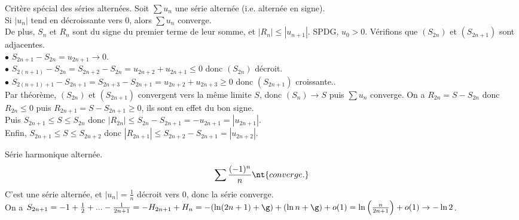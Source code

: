 \documentclass[11pt]{article}
\begin{document}
\begin{prop}{Critère spécial des séries alternées.}{}
    Soit $\sum u_n$ une série alternée (i.e. alternée en signe).\\
    Si $|u_n|$ tend en décroissante vers 0, alors $\sum u_n$ converge.\\
    De plus, $S_n$ et $R_n$ sont du signe du premier terme de leur somme, et $|R_n|\leq|u_{n+1}|$.
    \tcblower
    SPDG, $u_0>0$. Vérifions que $(S_{2n})$ et $(S_{2n+1})$ sont adjacentes.\\
    $\bullet$ $S_{2n+1}-S_{2n}=u_{2n+1}\to0$.\\
    $\bullet$ $S_{2(n+1)}-S_{2n}=S_{2n+2}-S_{2n}=u_{2n+2}+u_{2n+1}\leq 0$ donc $(S_{2n})$ décroit.\\
    $\bullet$ $S_{2(n+1)+1}-S_{2n+1}=S_{2n+3}-S_{2n+1}=u_{2n+2}+u_{2n+3}\geq0$ donc $(S_{2n+1})$ croissante..\\
    Par théorème, $(S_{2n})$ et $(S_{2n+1})$ convergent vers la même limite $S$, donc $(S_n)\to S$ puis $\sum u_n$ converge.\n
    On a $R_{2n}=S-S_{2n}$ donc $R_{2n}\leq0$ puis $R_{2n+1}=S-S_{2n+1}\geq0$, ils sont en effet du bon signe.\\
    Puis $S_{2n+1}\leq S \leq S_{2n}$ donc $|R_{2n}|\leq S_{2n} - S_{2n+1}=-u_{2n+1}=|u_{2n+1}|$.\\
    Enfin, $S_{2n+1}\leq S \leq S_{2n+2}$ donc $|R_{2n+1}|\leq S_{2n+2}-S_{2n+1}=|u_{2n+2}|$.
\end{prop}

\vspace*{-0.7cm}

\begin{ex}{Série harmonique alternée.}{}
    \begin{equation*}
        \sum\frac{(-1)^n}{n} \nt{ converge.}
    \end{equation*}
    \tcblower
    C'est une série alternée, et $|u_n|=\frac{1}{n}$ décroit vers 0, donc la série converge.\\
    On a $S_{2n+1}=-1+\frac{1}{2}+...-\frac{1}{2n+1}=-H_{2n+1}+H_n=-(\ln(2n+1)+\g)+(\ln n + \g) + o(1) = \ln\left( \frac{n}{2n+1} \right) + o(1) \to -\ln 2$.
\end{ex}
\end{document}
